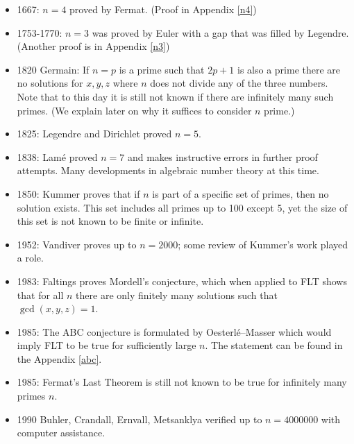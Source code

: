 \documentclass{article}
\theoremstyle{definition}
\theoremstyle{definition}
\theoremstyle{definition}
\begin{document}
\begin{itemize}
    \item 
    1667: $n=4$ proved by Fermat. (Proof in Appendix \ref{n4})
    
\item   1753-1770: $n=3$ was proved by Euler with a gap that was filled by Legendre. (Another proof is in Appendix \ref{n3})

\item 1820 Germain: If $n=p$ is a prime such that $2p+1$ is also a prime there are no solutions for $x,y,z$ where $n$ does not divide any of the three numbers. Note that to this day it is still not known if there are infinitely many such primes. (We explain later on why it suffices to consider $n$ prime.)

\item 1825: Legendre and Dirichlet proved $n=5$.

\item 1838: Lam\'{e} proved $n=7$ and makes instructive errors in further proof attempts. Many developments in algebraic number theory at this time. 

\item 1850: Kummer proves that if $n$ is part of a specific set of primes, then no solution exists. This set includes all  primes up to 100 except 5, yet the size of this set is not known to be finite or infinite.

\item 1952: Vandiver proves up to $n=2000$; some review of Kummer's work played a role.

\item 1983: Faltings proves Mordell's conjecture, which when applied to FLT shows that for all $n$ there are only finitely many solutions such that $\gcd(x,y,z)=1$.

\item 1985: The ABC conjecture is formulated by Oesterlé–Masser which would imply FLT to be true for sufficiently large $n$. The statement can be found in the Appendix \ref{abc}.

\item 1985: Fermat's Last Theorem is still not known to be true for infinitely many primes $n$.

\item 1990 Buhler, Crandall, Ernvall, Metsanklya verified up to $n=4000000$ with computer assistance.

\end{itemize}


\end{document}
